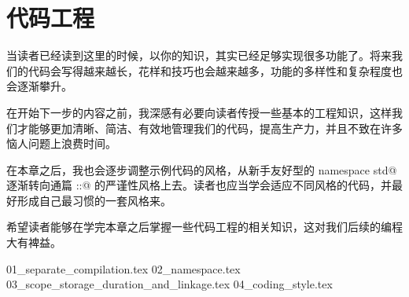 \chapter{代码工程}
当读者已经读到这里的时候，以你的知识，其实已经足够实现很多功能了。将来我们的代码会写得越来越长，花样和技巧也会越来越多，功能的多样性和复杂程度也会逐渐攀升。\par
在开始下一步的内容之前，我深感有必要向读者传授一些基本的工程知识，这样我们才能够更加清晰、简洁、有效地管理我们的代码，提高生产力，并且不致在许多恼人问题上浪费时间。\par
在本章之后，我也会逐步调整示例代码的风格，从新手友好型的 \lstinline@using namespace std@ 逐渐转向通篇 \lstinline@std::@ 的严谨性风格上去。读者也应当学会适应不同风格的代码，并最好形成自己最习惯的一套风格来。\par
希望读者能够在学完本章之后掌握一些代码工程的相关知识，这对我们后续的编程大有裨益。\par
{01_separate_compilation.tex}
{02_namespace.tex}
{03_scope_storage_duration_and_linkage.tex}
{04_coding_style.tex}